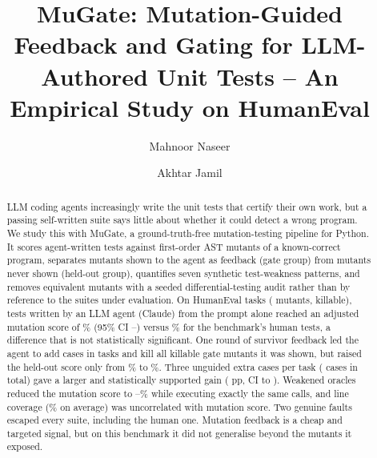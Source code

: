\documentclass[runningheads]{llncs}
\begin{document}
\title{MuGate: Mutation-Guided Feedback and Gating for LLM-Authored Unit Tests -- An Empirical Study on HumanEval}

\author{Mahnoor Naseer \and Akhtar Jamil}

\maketitle

\begin{abstract}
LLM coding agents increasingly write the unit tests that certify their own work, but a passing self-written suite says little about whether it could detect a wrong program. We study this with MuGate, a ground-truth-free mutation-testing pipeline for Python. It scores agent-written tests against first-order AST mutants of a known-correct program, separates mutants shown to the agent as feedback (gate group) from mutants never shown (held-out group), quantifies seven synthetic test-weakness patterns, and removes equivalent mutants with a seeded differential-testing audit rather than by reference to the suites under evaluation. On \nTasks{} HumanEval tasks (\nMut{} mutants, \nKillable{} killable), tests written by an LLM agent (Claude) from the prompt alone reached an adjusted mutation score of \msVanilla\% (95\% CI \loVanilla--\hiVanilla) versus \msHuman\% for the benchmark's human tests, a difference that is not statistically significant. One round of survivor feedback led the agent to add \gateCases{} cases in \tasksRevised{} tasks and kill all \survShownKillable{} killable gate mutants it was shown, but raised the held-out score only from \msHeldGrpVanilla\% to \msHeldGrpGate\%. Three unguided extra cases per task (\blindCases{} cases in total) gave a larger and statistically supported gain (\dBliVan{} pp, CI \ciLoBliVan{} to \ciHiBliVan). Weakened oracles reduced the mutation score to \msWFour--\msWThree\% while executing exactly the same calls, and line coverage (\covMean\% on average) was uncorrelated with mutation score. Two genuine faults escaped every suite, including the human one. Mutation feedback is a cheap and targeted signal, but on this benchmark it did not generalise beyond the mutants it exposed.

\end{abstract}
\end{document}
